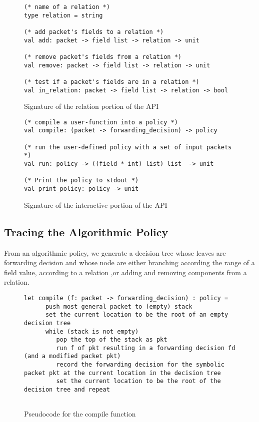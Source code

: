 \documentclass[preprint]{sigplanconf}
\begin{document}
\begin{figure}[ht]
  \begin{lstlisting}
(* name of a relation *)
type relation = string

(* add packet's fields to a relation *)
val add: packet -> field list -> relation -> unit

(* remove packet's fields from a relation *)
val remove: packet -> field list -> relation -> unit

(* test if a packet's fields are in a relation *)
val in_relation: packet -> field list -> relation -> bool
\end{lstlisting}

\caption{Signature of the relation portion of the API}
\label{fig:rel_api}
\end{figure}




\begin{figure}[ht]
  \begin{lstlisting}
(* compile a user-function into a policy *)
val compile: (packet -> forwarding_decision) -> policy
    
(* run the user-defined policy with a set of input packets *)
val run: policy -> ((field * int) list) list  -> unit
    
(* Print the policy to stdout *)
val print_policy: policy -> unit
  \end{lstlisting}

  \caption{Signature of the interactive portion of the API}
  \label{fig:build_api}
\end{figure}

\subsection*{Tracing the Algorithmic Policy}
From an algorithmic policy, we generate a decision tree  whose leaves are forwarding decision and whose node are either branching according the range of a field value, according to a relation ,or adding and removing components from a relation.

\begin{figure}[ht]
\begin{lstlisting}
let compile (f: packet -> forwarding_decision) : policy =
      push most general packet to (empty) stack
      set the current location to be the root of an empty decision tree
      while (stack is not empty)
         pop the top of the stack as pkt
         run f of pkt resulting in a forwarding decision fd (and a modified packet pkt)
         record the forwarding decision for the symbolic packet pkt at the current location in the decision tree
         set the current location to be the root of the decision tree and repeat
  
\end{lstlisting}
\caption{Pseudocode for the compile function}
\label{fig:compile-pseudo}
\end{figure}
\end{document}
